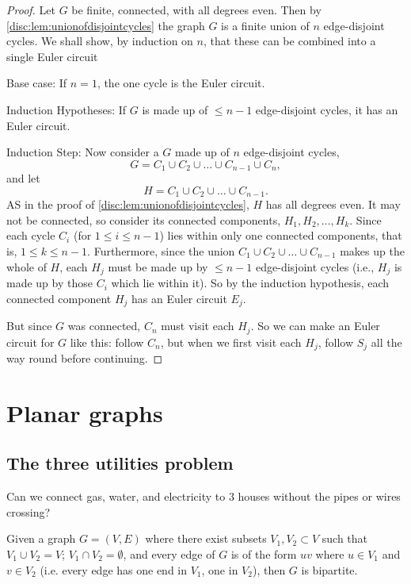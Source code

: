 \documentclass[10pt, a4paper]{article}
\begin{document}
\begin{proof}
    Let $G$ be finite,
    connected,
    with all degrees even.
    Then by \autoref{disc:lem:unionofdisjointcycles} the graph $G$ is a finite union of $n$ edge-disjoint cycles.
    We shall show,
    by induction on $n$,
    that these can be combined into a single Euler circuit

    Base case:
    If $n = 1$,
    the one cycle is the Euler circuit.

    Induction Hypotheses:
    If $G$ is made up of $\leq n - 1$ edge-disjoint cycles,
    it has an Euler circuit.

    Induction Step:
    Now consider a $G$ made up of $n$ edge-disjoint cycles,
    \[
    G = C_1 \cup C_2 \cup \dotsc \cup C_{n - 1} \cup C_n,
    \]
    and let
    \[
    H = C_1 \cup C_2 \cup \dotsc \cup C_{n - 1}.
    \]
    AS in the proof of \autoref{disc:lem:unionofdisjointcycles},
    $H$ has all degrees even.
    It may not be connected,
    so consider its connected components,
    $H_1, H_2, \dotsc, H_k$.
    Since each cycle $C_i$
    (for $1 \leq i \leq n - 1$)
    lies within only one connected components,
    that is,
    $1 \leq k \leq n - 1$.
    Furthermore,
    since the union $C_1 \cup C_2 \cup \dotsc \cup C_{n - 1}$ makes up the whole of $H$,
    each $H_j$ must be made up by $\leq n - 1$ edge-disjoint cycles
    (i.e.,
    $H_j$ is made up by those $C_i$ which lie within it).
    So by the induction hypothesis,
    each connected component $H_j$ has an Euler circuit $E_j$.

    But since $G$ was connected,
    $C_n$ must visit each $H_j$.
    So we can make an Euler circuit for $G$ like this:
    follow $C_n$,
    but when we first visit each $H_j$,
    follow $S_j$ all the way round before continuing.
\end{proof}

\newpage

\section{Planar graphs}

\subsection{The three utilities problem}
Can we connect gas,
water,
and electricity to $3$ houses without the pipes or wires crossing?

\begin{definition}
    Given a graph $G = (V, E)$ where there exist subsets $V_1, V_2 \subset V$ such that $V_1 \cup V_2 = V$;
    $V_1 \cap V_2 = \emptyset$,
    and every edge of $G$ is of the form $uv$ where $u \in V_1$ and $v \in V_2$
    (i.e. every edge has one end in $V_1$,
    one in $V_2$),
    then $G$ is bipartite.
\end{definition}
\end{document}
